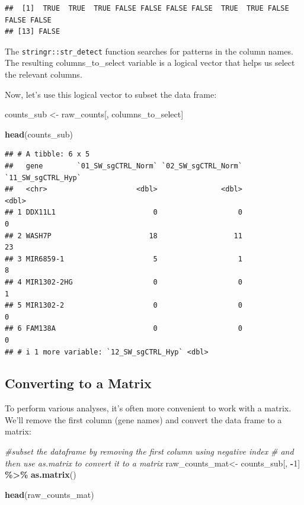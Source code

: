 \documentclass[
]{book}
\newenvironment{Shaded}{\begin{snugshade}}{\end{snugshade}}
\newcommand{\CommentTok}[1]{\textcolor[rgb]{0.56,0.35,0.01}{\textit{#1}}}
\newcommand{\DecValTok}[1]{\textcolor[rgb]{0.00,0.00,0.81}{#1}}
\newcommand{\FunctionTok}[1]{\textcolor[rgb]{0.13,0.29,0.53}{\textbf{#1}}}
\newcommand{\NormalTok}[1]{#1}
\newcommand{\OtherTok}[1]{\textcolor[rgb]{0.56,0.35,0.01}{#1}}
\newcommand{\SpecialCharTok}[1]{\textcolor[rgb]{0.81,0.36,0.00}{\textbf{#1}}}
\begin{document}
\begin{verbatim}
##  [1]  TRUE  TRUE  TRUE FALSE FALSE FALSE FALSE  TRUE  TRUE FALSE FALSE FALSE
## [13] FALSE
\end{verbatim}

The \texttt{stringr::str\_detect} function searches for patterns in the column names. The resulting columns\_to\_select variable is a logical vector that helps us select the relevant columns.

Now, let's use this logical vector to subset the data frame:

\begin{Shaded}
\begin{Highlighting}[]
\NormalTok{counts\_sub }\OtherTok{\textless{}{-}}\NormalTok{ raw\_counts[, columns\_to\_select]}

\FunctionTok{head}\NormalTok{(counts\_sub)}
\end{Highlighting}
\end{Shaded}

\begin{verbatim}
## # A tibble: 6 x 5
##   gene        `01_SW_sgCTRL_Norm` `02_SW_sgCTRL_Norm` `11_SW_sgCTRL_Hyp`
##   <chr>                     <dbl>               <dbl>              <dbl>
## 1 DDX11L1                       0                   0                  0
## 2 WASH7P                       18                  11                 23
## 3 MIR6859-1                     5                   1                  8
## 4 MIR1302-2HG                   0                   0                  1
## 5 MIR1302-2                     0                   0                  0
## 6 FAM138A                       0                   0                  0
## # i 1 more variable: `12_SW_sgCTRL_Hyp` <dbl>
\end{verbatim}

\hypertarget{converting-to-a-matrix}{%
\subsection{Converting to a Matrix}\label{converting-to-a-matrix}}

To perform various analyses, it's often more convenient to work with a matrix. We'll remove the first column (gene names) and convert the data frame to a matrix:

\begin{Shaded}
\begin{Highlighting}[]
\CommentTok{\#subset the dataframe by removing the first column using negative index}
\CommentTok{\# and then use as.matrix to convert it to a matrix}
\NormalTok{raw\_counts\_mat}\OtherTok{\textless{}{-}}\NormalTok{ counts\_sub[, }\SpecialCharTok{{-}}\DecValTok{1}\NormalTok{] }\SpecialCharTok{\%\textgreater{}\%} 
              \FunctionTok{as.matrix}\NormalTok{()}

\FunctionTok{head}\NormalTok{(raw\_counts\_mat)}
\end{Highlighting}
\end{Shaded}
\end{document}

